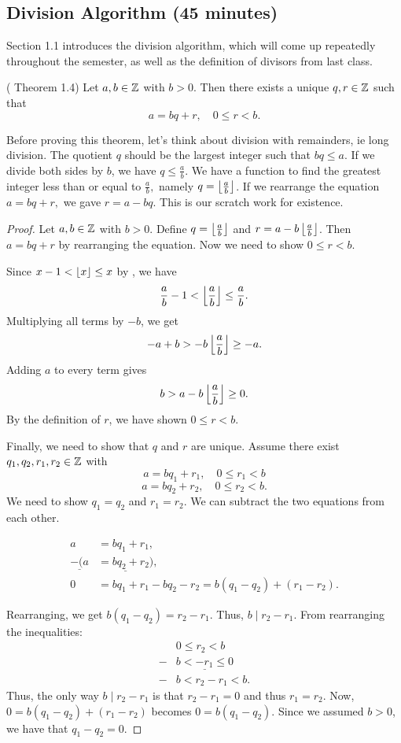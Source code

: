 \documentclass{ximera}
\begin{document}
\subsection{Division Algorithm (45 minutes)}
Section 1.1 introduces the division algorithm, which will come up repeatedly throughout the semester, as well as the definition of divisors from last class.

\begin{thm*}\label{div-alg}( Theorem 1.4)
 Let $a,b\in\mathbb Z$ with $b>0$. Then there exists a unique $q,r\in\mathbb Z$ such that \[a=bq+r, \quad 0\leq r <b.\]
\end{thm*}

Before proving this theorem, let's think about division with remainders, ie long division. The quotient $q$ should be the largest integer such that $bq\leq a$. If we divide both sides by $b$, we have $q\leq\frac{a}{b}$. We have a function to find the greatest integer less than or equal to $\frac{a}{b},$ namely $q=\left\lfloor \frac{a}{b}\right\rfloor$. If we rearrange the equation $a=bq+r,$ we gave $r=a-bq$. This is our scratch work for existence.

\begin{proof} Let $a,b\in\mathbb Z$ with $b>0$.
Define $q=\left\lfloor \frac{a}{b}\right\rfloor$ and $r=a-b\left\lfloor \frac{a}{b}\right\rfloor$. Then $a=bq+r$ by rearranging the equation. 
Now we need to show $0\leq r<b$. 

Since $x-1<\left\lfloor  x\right\rfloor\leq x$ by , we have \[\frac{a}{b}-1<\left\lfloor \frac{a}{b}\right\rfloor\leq\frac{a}{b}.\] 
Multiplying all terms by $-b$, we get 
 \[-a+b>-b\left\lfloor \frac{a}{b}\right\rfloor\geq-a.\]
 Adding $a$ to every term gives \[b>a-b\left\lfloor \frac{a}{b}\right\rfloor\geq 0.\] 
By the definition of $r$, we have shown $0\leq r <b$.

Finally, we need to show that $q$ and $r$ are unique.
Assume there exist $q_1,q_2,r_1,r_2\in\mathbb Z$ with \[a=bq_1+r_1, \quad 0\leq r_1<b\]
 \[a=bq_2+r_2, \quad 0\leq r_2<b.\]
 We need to show $q_1=q_2$ and $r_1=r_2$. We can subtract the two equations from each other. 
 
\begin{align*}
  a&=bq_1+r_1, \\
\underline{ -(a}&\underline{=bq_2+r_2)}, \\
 0&=bq_1+r_1-bq_2-r_2=b(q_1-q_2)+(r_1-r_2) . 
\end{align*}

Rearranging, we get $b(q_1-q_2)=r_2-r_1$. Thus, $b\mid r_2-r_1$. From rearranging the inequalities:
\begin{align*}
 & 0\leq r_2<b\\
- & \underline{b< -r_1\leq 0}\\
 -&b<r_2-r_1<b.
\end{align*}
Thus, the only way $b\mid r_2-r_1$ is that $r_2-r_1=0$ and thus $r_1=r_2$. Now, $0=b(q_1-q_2)+(r_1-r_2)$ becomes $0=b(q_1-q_2)$. Since we assumed $b>0$, we have that $q_1-q_2=0$. 
\end{proof}
\end{document}
